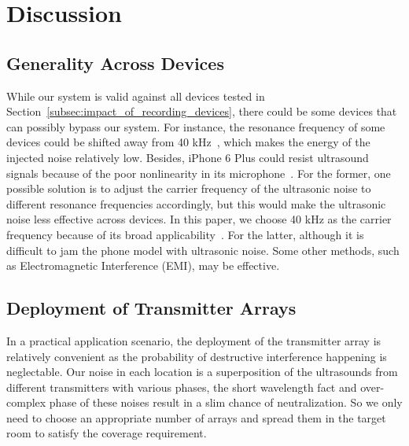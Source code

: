 \section{Discussion}
\label{sec:discussion}

\subsection{Generality Across Devices}
While our system is valid against all devices tested in Section~\ref{subsec:impact_of_recording_devices}, there could be some devices that can possibly bypass our system. For instance, the resonance frequency of some devices could be shifted away from 40 kHz~\cite{10.1145/3133956.3134052,backdoor}, which makes the energy of the injected noise relatively low. Besides, iPhone 6 Plus could resist ultrasound signals because of the poor nonlinearity in its microphone~\cite{10.1145/3133956.3134052}. For the former, one possible solution is to adjust the carrier frequency of the ultrasonic noise to different resonance frequencies accordingly, but this would make the ultrasonic noise less effective across devices. In this paper, we choose 40 kHz as the carrier frequency because of its broad applicability~\cite{10.1145/3133956.3134052, backdoor}. For the latter, although it is difficult to jam the phone model with ultrasonic noise. Some other methods, such as Electromagnetic Interference (EMI), may be effective.
\subsection{Deployment of Transmitter Arrays}
In a practical application scenario, the deployment of the transmitter array is relatively convenient as the probability of destructive interference happening is neglectable. Our noise in each location is a superposition of the ultrasounds from different transmitters with various phases, the short wavelength fact and over-complex phase of these noises result in a slim chance of neutralization. So we only need to choose an appropriate number of arrays and spread them in the target room to satisfy the coverage requirement.